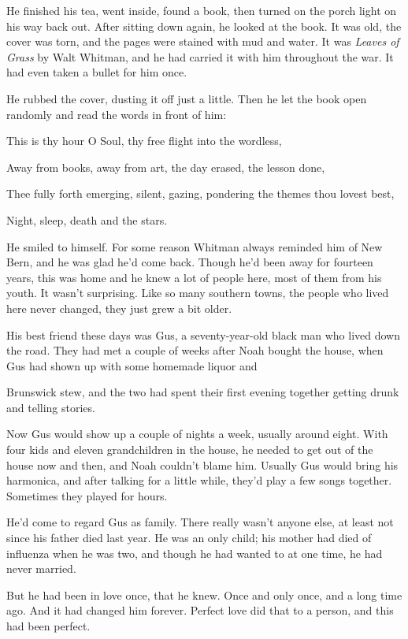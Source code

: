 \documentclass[10pt, twoside, openright]{book}
\begin{document}
He finished his tea, went inside, found a book, then turned on the porch
light on his way back out. After sitting down again, he looked at the
book. It was old, the cover was torn, and the pages were stained with
mud and water. It was \emph{Leaves of Grass} by Walt Whitman, and he had
carried it with him throughout the war. It had even taken a bullet for
him once.

He rubbed the cover, dusting it off just a little. Then he let the book
open randomly and read the words in front of him:


This is thy hour O Soul, thy free flight into the wordless,

Away from books, away from art, the day erased, the lesson done,

Thee fully forth emerging, silent, gazing, pondering the themes thou
lovest best,

Night, sleep, death and the stars.


He smiled to himself. For some reason Whitman always reminded him of New
Bern, and he was glad he'd come back. Though he'd been away for fourteen
years, this was home and he knew a lot of people here, most of them from
his youth. It wasn't surprising. Like so many southern towns, the people
who lived here never changed, they just grew a bit older.

His best friend these days was Gus, a seventy-year-old black man who
lived down the road. They had met a couple of weeks after Noah bought
the house, when Gus had shown up with some homemade liquor and

Brunswick stew, and the two had spent their first evening together
getting drunk and telling stories.

Now Gus would show up a couple of nights a week, usually around eight.
With four kids and eleven grandchildren in the house, he needed to get
out of the house now and then, and Noah couldn't blame him. Usually Gus
would bring his harmonica, and after talking for a little while, they'd
play a few songs together. Sometimes they played for hours.

He'd come to regard Gus as family. There really wasn't anyone else, at
least not since his father died last year. He was an only child; his
mother had died of influenza when he was two, and though he had wanted
to at one time, he had never married.

But he had been in love once, that he knew. Once and only once, and a
long time ago. And it had changed him forever. Perfect love did that to
a person, and this had been perfect.
\end{document}
